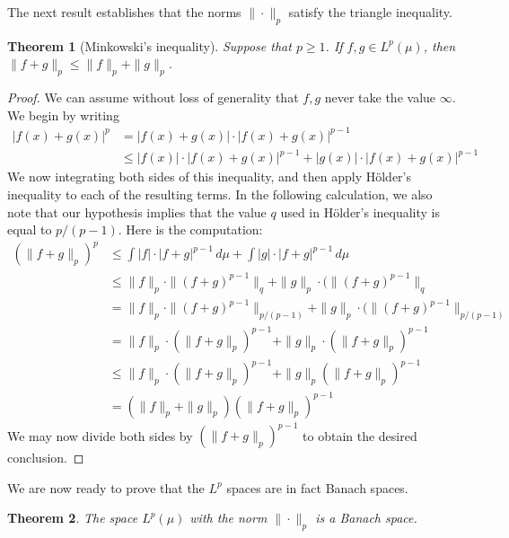 \documentclass[11pt,oneside]{amsbook}
\theoremstyle{definition}
\theoremstyle{plain}
\newtheorem{thm}{Theorem}[section]
\theoremstyle{definition}
\theoremstyle{remark}
\numberwithin{equation}{section}
\numberwithin{figure}{section}
\begin{document}
The next result establishes that the norms $\|\cdot\|_p$ satisfy the triangle inequality.

\begin{thm}[Minkowski's inequality]
  Suppose that $p\geq1$. If $f,g\in L^p(\mu)$, then $\|f+g\|_p\leq\|f\|_p+\|g\|_p$.
\end{thm}

\begin{proof}
  We can assume without loss of generality that $f,g$ never take the value $\infty$. We begin by writing
  \begin{align*}
    |f(x)+g(x)|^p&=|f(x)+g(x)|\cdot|f(x)+g(x)|^{p-1}\\
                 &\leq|f(x)|\cdot|f(x)+g(x)|^{p-1}
                   +|g(x)|\cdot|f(x)+g(x)|^{p-1}
  \end{align*}
  We now integrating both sides of this inequality, and then apply H\"older's inequality to each of the resulting terms. In the following calculation, we also note that our hypothesis implies that the value $q$ used in H\"older's inequality is equal to $p/(p-1)$. Here is the computation:
  \begin{align*}
    (\|f+g\|_p)^p&\leq\int|f|\cdot|f+g|^{p-1}\,d\mu
                   +\int|g|\cdot|f+g|^{p-1}\,d\mu\\
                 &\leq\|f\|_p\cdot\|(f+g)^{p-1}\|_q
                   +\|g\|_p\cdot(\|(f+g)^{p-1}\|_q\\
                 &=\|f\|_p\cdot\|(f+g)^{p-1}\|_{p/(p-1)}
                   +\|g\|_p\cdot(\|(f+g)^{p-1}\|_{p/(p-1)}\\
                 &=\|f\|_p\cdot(\|f+g\|_p)^{p-1}
                   +\|g\|_p\cdot(\|f+g\|_p)^{p-1}\\
                 &\leq\|f\|_p\cdot(\|f+g\|_p)^{p-1}
                   +\|g\|_p(\|f+g\|_p)^{p-1}\\
                 &=(\|f\|_p+\|g\|_p)(\|f+g\|_p)^{p-1}
  \end{align*}
  We may now divide both sides by $(\|f+g\|_p)^{p-1}$ to obtain the desired conclusion.
\end{proof}

We are now ready to prove that the $L^p$ spaces are in fact Banach spaces.

\begin{thm}
  The space $L^p(\mu)$ with the norm $\|\cdot\|_p$ is a Banach space.
\end{thm}
\end{document}
